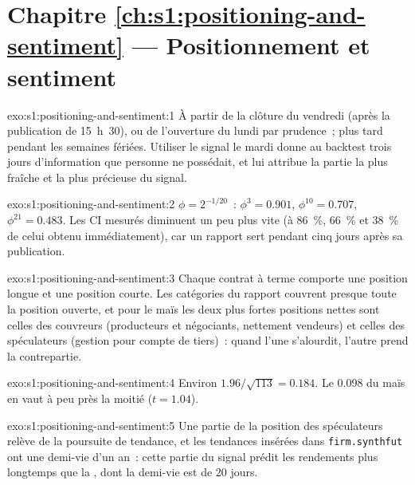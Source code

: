 \section*{Chapitre \ref{ch:s1:positioning-and-sentiment} --- Positionnement et sentiment}

\begin{solution}{exo:s1:positioning-and-sentiment:1}
À partir de la clôture du vendredi (après la publication de 15~h~30), ou de l'ouverture du lundi par prudence~; plus tard pendant les semaines fériées. Utiliser le signal le mardi donne au backtest trois jours
d'information que personne ne possédait, et lui attribue la partie la plus fraîche et la plus précieuse du signal.
\end{solution}

\begin{solution}{exo:s1:positioning-and-sentiment:2}
$\phi = 2^{-1/20}$~: $\phi^3 = 0.901$, $\phi^{10} = 0.707$, $\phi^{21} = 0.483$. Les CI mesurés diminuent un peu plus vite (à 86~\%, 66~\% et 38~\% de
celui obtenu immédiatement), car un rapport sert pendant cinq jours après sa publication.
\end{solution}

\begin{solution}{exo:s1:positioning-and-sentiment:3}
Chaque contrat à terme comporte une position longue et une position courte. Les catégories du rapport couvrent presque toute la position ouverte, et pour le maïs les deux plus fortes positions nettes
sont celles des couvreurs (producteurs et négociants, nettement vendeurs) et celles des spéculateurs (gestion pour compte de tiers)~: quand l'une s'alourdit, l'autre prend la contrepartie.
\end{solution}

\begin{solution}{exo:s1:positioning-and-sentiment:4}
Environ $1.96/\sqrt{113} = 0.184$. Le 0.098 du maïs en vaut à peu près la moitié ($t = 1.04$).
\end{solution}

\begin{solution}{exo:s1:positioning-and-sentiment:5}
Une partie de la position des spéculateurs relève de la poursuite de tendance, et les tendances insérées dans \texttt{firm.synthfut} ont une demi-vie d'un an~: cette partie du signal
prédit les rendements plus longtemps que la , dont la demi-vie est de 20 jours.
\end{solution}

